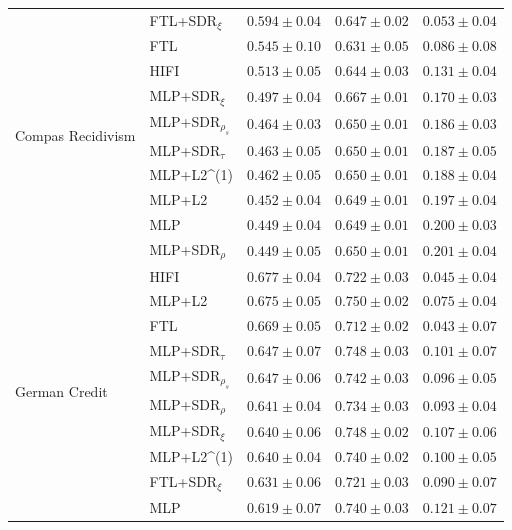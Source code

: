 \begin{tabular}{lllll}
\cline{1-5}
\multirow[t]{10}{*}{Compas Recidivism} & FTL+SDR$_{\xi}$ & $0.594 \pm0.04$ & $0.647 \pm0.02$ & $0.053 \pm0.04$ \\
 & FTL & $0.545 \pm0.10$ & $0.631 \pm0.05$ & $0.086 \pm0.08$ \\
 & HIFI & $0.513 \pm0.05$ & $0.644 \pm0.03$ & $0.131 \pm0.04$ \\
 & MLP+SDR$_{\xi}$ & $0.497 \pm0.04$ & $0.667 \pm0.01$ & $0.170 \pm0.03$ \\
 & MLP+SDR$_{\rho_s}$ & $0.464 \pm0.03$ & $0.650 \pm0.01$ & $0.186 \pm0.03$ \\
 & MLP+SDR$_{\tau}$ & $0.463 \pm0.05$ & $0.650 \pm0.01$ & $0.187 \pm0.05$ \\
 & MLP+L2^{(1)} & $0.462 \pm0.05$ & $0.650 \pm0.01$ & $0.188 \pm0.04$ \\
 & MLP+L2 & $0.452 \pm0.04$ & $0.649 \pm0.01$ & $0.197 \pm0.04$ \\
 & MLP & $0.449 \pm0.04$ & $0.649 \pm0.01$ & $0.200 \pm0.03$ \\
 & MLP+SDR$_{\rho}$ & $0.449 \pm0.05$ & $0.650 \pm0.01$ & $0.201 \pm0.04$ \\
\cline{1-5}
\multirow[t]{10}{*}{German Credit} & HIFI & $0.677 \pm0.04$ & $0.722 \pm0.03$ & $0.045 \pm0.04$ \\
 & MLP+L2 & $0.675 \pm0.05$ & $0.750 \pm0.02$ & $0.075 \pm0.04$ \\
 & FTL & $0.669 \pm0.05$ & $0.712 \pm0.02$ & $0.043 \pm0.07$ \\
 & MLP+SDR$_{\tau}$ & $0.647 \pm0.07$ & $0.748 \pm0.03$ & $0.101 \pm0.07$ \\
 & MLP+SDR$_{\rho_s}$ & $0.647 \pm0.06$ & $0.742 \pm0.03$ & $0.096 \pm0.05$ \\
 & MLP+SDR$_{\rho}$ & $0.641 \pm0.04$ & $0.734 \pm0.03$ & $0.093 \pm0.04$ \\
 & MLP+SDR$_{\xi}$ & $0.640 \pm0.06$ & $0.748 \pm0.02$ & $0.107 \pm0.06$ \\
 & MLP+L2^{(1)} & $0.640 \pm0.04$ & $0.740 \pm0.02$ & $0.100 \pm0.05$ \\
 & FTL+SDR$_{\xi}$ & $0.631 \pm0.06$ & $0.721 \pm0.03$ & $0.090 \pm0.07$ \\
 & MLP & $0.619 \pm0.07$ & $0.740 \pm0.03$ & $0.121 \pm0.07$ \\
\cline{1-5}
\bottomrule
\end{tabular}
